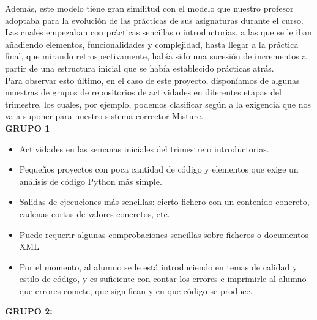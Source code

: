 Además, este modelo tiene gran similitud con el modelo que nuestro profesor adoptaba para la evolución de las prácticas de sus asignaturas durante el curso. Las cuales empezaban con prácticas sencillas o introductorias, a las que se le iban añadiendo elementos, funcionalidades y complejidad, hasta llegar a la práctica final, que mirando retrospectivamente, había sido una sucesión de incrementos a partir de una estructura inicial que se había establecido prácticas atrás.\\


Para observar esto último, en el caso de este proyecto, disponíamos de algunas muestras de grupos de repositorios de actividades en diferentes etapas del trimestre, los cuales, por ejemplo, podemos clasificar según a la exigencia que nos va a suponer para nuestro sistema corrector Misture.\\

\textbf{GRUPO 1}


\begin{itemize}
\item Actividades en las semanas iniciales del trimestre o introductorias.

\item Pequeños proyectos con poca cantidad de código y elementos que exige un análisis de código Python más simple.

\item Salidas de ejecuciones más sencillas: cierto fichero con un contenido concreto, cadenas cortas de valores concretos, etc.

\item Puede requerir algunas comprobaciones sencillas sobre ficheros o documentos XML

\item Por el momento, al alumno se le está introduciendo en temas de calidad y estilo de código, y es suficiente con contar los errores e imprimirle al alumno que errores comete, que significan y en que código se produce.
\end{itemize}

\vspace{1.5cm}
\textbf{GRUPO 2:}


